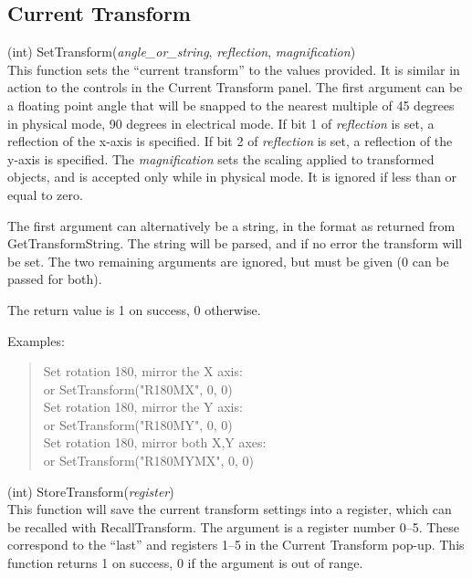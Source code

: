\subsection{Current Transform}

\begin{description}
\item{(int) \vt SetTransform({\it angle\_or\_string\/}, {\it reflection\/},
 {\it magnification\/})}\\
This function sets the ``current transform'' to the values provided. 
It is similar in action to the controls in the {\cb Current Transform}
panel.  The first argument can be a floating point angle that will be
snapped to the nearest multiple of 45 degrees in physical mode, 90
degrees in electrical mode.  If bit 1 of {\it reflection\/} is set, a
reflection of the x-axis is specified.  If bit 2 of {\it reflection\/}
is set, a reflection of the y-axis is specified.  The {\it
magnification\/} sets the scaling applied to transformed objects, and
is accepted only while in physical mode.  It is ignored if less than
or equal to zero.

The first argument can alternatively be a string, in the format as
returned from {\vt GetTransformString}.  The string will be parsed,
and if no error the transform will be set.  The two remaining
arguments are ignored, but must be given (0 can be passed for both).

The return value is 1 on success, 0 otherwise.

Examples:
\begin{quote}\rr
Set rotation 180, mirror the X axis:\\
\hspace*{1em}{\vt SetTransform(180, 1, 1)} or
  {\vt SetTransform("R180MX", 0, 0)}\\
Set rotation 180, mirror the Y axis:\\
\hspace*{1em}{\vt SetTransform(180, 2, 1)} or
  {\vt SetTransform("R180MY", 0, 0)}\\
Set rotation 180, mirror both X,Y axes:\\
\hspace*{1em}{\vt SetTransform(180, 3, 1)} or
  {\vt SetTransform("R180MYMX", 0, 0)}\\
\end{quote}

\item{(int) \vt StoreTransform({\it register\/})}\\
This function will save the current transform settings into a
register, which can be recalled with {\vt RecallTransform}.  The
argument is a register number 0--5.  These correspond to the ``last''
and registers 1--5 in the {\cb Current Transform} pop-up.  This
function returns 1 on success, 0 if the argument is out of range.


\end{description}
